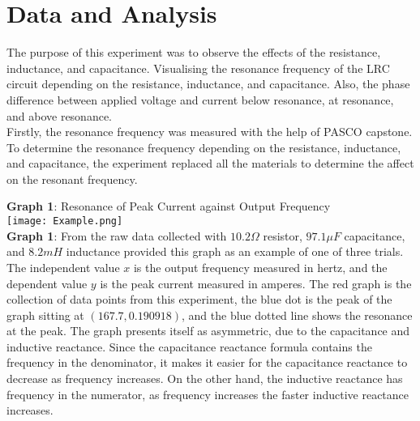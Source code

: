 \documentclass[11pt]{article}
\begin{document}
\section*{Data and Analysis}
The purpose of this experiment was to observe the effects of the resistance, inductance, and capacitance. Visualising the resonance frequency of the LRC circuit depending on the resistance, inductance, and capacitance. Also, the phase difference between applied voltage and current below resonance, at resonance, and above resonance.\\
Firstly, the resonance frequency was measured with the help of PASCO capstone. To determine the resonance frequency depending on the resistance, inductance, and capacitance, the experiment replaced all the materials to determine the affect on the resonant frequency. 
\begin{center}
    \textbf{Graph 1}: Resonance of Peak Current against Output Frequency\\
    \texttt{[image: Example.png]}\\\textbf{Graph 1}: From the raw data collected with $10.2\Omega$ resistor, $97.1\mu F$ capacitance, and $8.2mH$ inductance provided this graph as an example of one of three trials. The independent value $x$ is the output frequency measured in hertz, and the dependent value $y$ is the peak current measured in amperes. The red graph is the collection of data points from this experiment, the blue dot is the peak of the graph sitting at $(167.7,0.190918)$, and the blue dotted line shows the resonance at the peak. The graph presents itself as asymmetric, due to the capacitance and inductive reactance. Since the capacitance reactance formula contains the frequency in the denominator, it makes it easier for the capacitance reactance to decrease as frequency increases. On the other hand, the inductive reactance has frequency in the numerator, as frequency increases the faster inductive reactance increases. 
\end{center}
\end{document}
